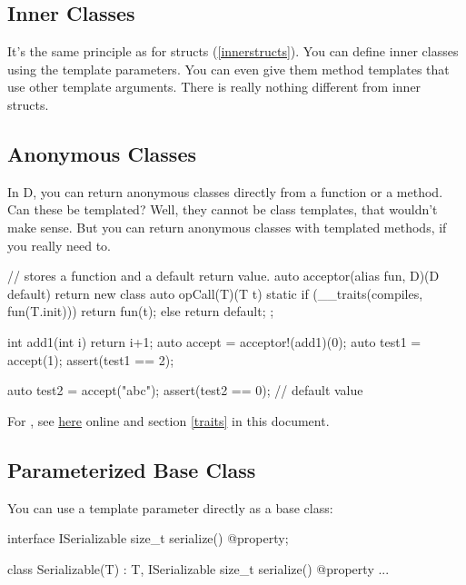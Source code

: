 \subsection{Inner Classes}\label{innerclasses}

It's the same principle as for structs (\ref{innerstructs}). You can define inner classes using the template parameters. You can even give them method templates that use other template arguments. There is really nothing different from inner structs.

\subsection{Anonymous Classes}\label{anonymousclasses}

In D, you can return anonymous classes directly from a function or a method. Can these be templated? Well, they cannot be class templates, that wouldn't make sense. But you can return anonymous classes with templated methods, if you really need to.

\begin{dcode}
// stores a function and a default return value.
auto acceptor(alias fun, D)(D default)
{
    return new class 
    { 
        auto opCall(T)(T t)
        {
            static if (__traits(compiles, fun(T.init)))
                return fun(t); 
            else
                return default;
        }
    };
}

int add1(int i) { return i+1;}
auto accept = acceptor!(add1)(0);
auto test1 = accept(1); 
assert(test1 == 2);

auto test2 = accept("abc");
assert(test2 == 0); // default value
\end{dcode}


For , see \href{www.dlang.org/traits.html}{here} online and section \ref{traits} in this document.

\subsection{Parameterized Base Class}

You can use a template parameter directly as a base class:

\begin{dcode}
interface ISerializable
{
    size_t serialize() @property;
}

class Serializable(T) : T, ISerializable
{
    size_t serialize() @property { ... }
} 
\end{dcode}

